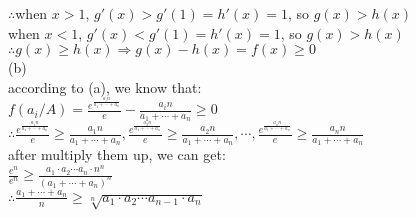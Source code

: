 \documentclass{article}
\begin{document}
$\therefore$\qquad when $x>1$, $g'(x)>g'(1)=h'(x)=1$, so $g(x)>h(x)$\\

\qquad\quad when $x<1$, $g'(x)<g'(1)=h'(x)=1$, so $g(x)>h(x)$\\

$\therefore$\qquad$g(x)\geq h(x)\Rightarrow g(x)-h(x)=f(x)\geq0$\\

(b)\\

according to (a), we know that:\\

$f(a_i/A)=\displaystyle\frac{e^{\frac{a_in}{a_1+\cdots+a_n}}}{e}-\frac{a_in}{a_1+\cdots+a_n}\geq0$\\

$\therefore$\qquad$\displaystyle\frac{e^{\frac{a_1n}{a_1+\cdots+a_n}}}{e}\geq\frac{a_1n}{a_1+\cdots+a_n}, \frac{e^{\frac{a_2n}{a_1+\cdots+a_n}}}{e}\geq\frac{a_2n}{a_1+\cdots+a_n}, \cdots, \frac{e^{\frac{a_nn}{a_1+\cdots+a_n}}}{e}\geq\frac{a_nn}{a_1+\cdots+a_n}$\\

after multiply them up, we can get:\\

$\displaystyle\frac{e^n}{e^n}\geq\frac{a_1\cdot a_2\cdots a_n\cdot n^n}{(a_1+\cdots+a_n)^n}$\\

$\therefore$\qquad$\displaystyle\frac{a_1+\cdots+a_n}{n}\geq\sqrt[n]{a_1\cdot a_2\cdots a_{n-1}\cdot a_n}$\\
\end{document}
